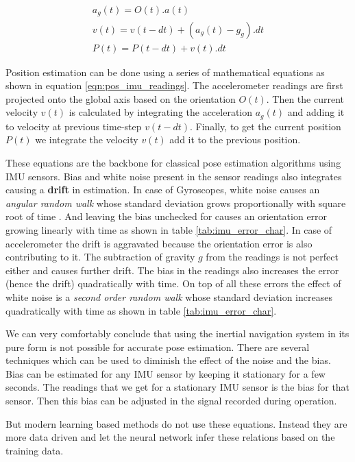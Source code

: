 \begin{equation}
  \label{eqn:pos_imu_readings}
  \begin{gathered}
    a_g(t) = O(t).a(t) \\
    v(t) = v(t-dt) + (a_g(t) - g_g).dt \\
    P(t) = P(t-dt) + v(t).dt
  \end{gathered}
\end{equation}

 Position estimation can be done using a series of mathematical equations as shown in equation \ref{eqn:pos_imu_readings}. The accelerometer readings are first projected onto the global axis based on the orientation $ O(t) $. Then the current velocity $ v(t) $ is calculated by integrating the acceleration $ a_g(t) $ and adding it to velocity at previous time-step $ v(t-dt) $. Finally, to get the current position $ P(t) $ we integrate the velocity $ v(t) $ add it to the previous position. 

These equations are the backbone for classical pose estimation algorithms using IMU sensors. Bias and white noise present in the sensor readings also integrates causing a \textbf{drift} in estimation. In case of Gyroscopes, white noise causes an \textit{angular random walk} whose standard deviation grows proportionally with square root of time \citep{woodman2007introduction}. And leaving the bias unchecked for causes an orientation error growing linearly with time as shown in table  \ref{tab:imu_error_char}. In case of accelerometer the drift is aggravated because the orientation error is also contributing to it. The subtraction of gravity $ g $ from the readings is not perfect either and causes further drift. The bias in the readings also increases the error (hence the drift) quadratically with time. On top of all these errors the effect of white noise  is a \textit{second order random walk} whose standard deviation increases quadratically with time as shown in table \ref{tab:imu_error_char}.

We can very comfortably conclude that using the inertial navigation system in its pure form is not possible for accurate pose estimation. There are several techniques which can be used to diminish the effect of the noise and the bias. Bias can be estimated for any IMU sensor by keeping it stationary for a few seconds. The readings that we get for a stationary IMU sensor is the bias for that sensor. Then this bias can be adjusted in the signal recorded during operation.

But modern learning based methods do not use these equations. Instead they are more data driven and let the neural network infer these relations based on the training data.

